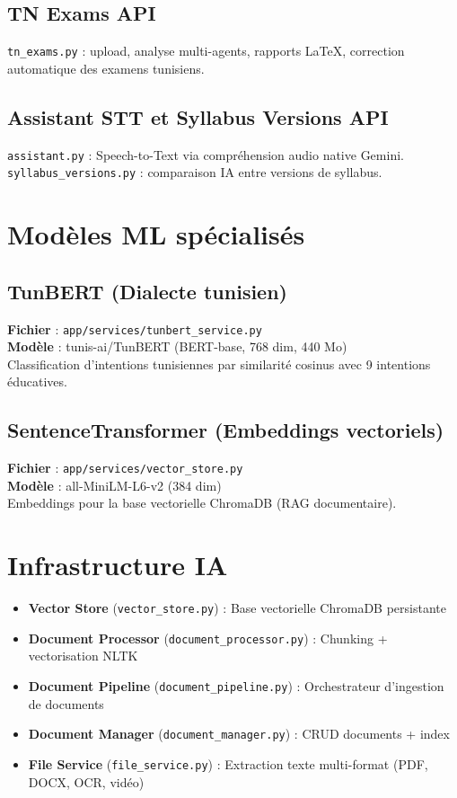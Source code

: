 \documentclass[12pt,a4paper]{article}
\begin{document}
\subsection{TN Exams API}
\texttt{tn\_exams.py} : upload, analyse multi-agents, rapports LaTeX, correction automatique des examens tunisiens.

\subsection{Assistant STT et Syllabus Versions API}
\texttt{assistant.py} : Speech-to-Text via compréhension audio native Gemini. \\
\texttt{syllabus\_versions.py} : comparaison IA entre versions de syllabus.

\section{Modèles ML spécialisés}

\subsection{TunBERT (Dialecte tunisien)}
\textbf{Fichier} : \texttt{app/services/tunbert\_service.py} \\
\textbf{Modèle} : tunis-ai/TunBERT (BERT-base, 768 dim, 440 Mo) \\
Classification d'intentions tunisiennes par similarité cosinus avec 9 intentions éducatives.

\subsection{SentenceTransformer (Embeddings vectoriels)}
\textbf{Fichier} : \texttt{app/services/vector\_store.py} \\
\textbf{Modèle} : all-MiniLM-L6-v2 (384 dim) \\
Embeddings pour la base vectorielle ChromaDB (RAG documentaire).

\section{Infrastructure IA}

\begin{itemize}[leftmargin=*]
    \item \textbf{Vector Store} (\texttt{vector\_store.py}) : Base vectorielle ChromaDB persistante
    \item \textbf{Document Processor} (\texttt{document\_processor.py}) : Chunking + vectorisation NLTK
    \item \textbf{Document Pipeline} (\texttt{document\_pipeline.py}) : Orchestrateur d'ingestion de documents
    \item \textbf{Document Manager} (\texttt{document\_manager.py}) : CRUD documents + index
    \item \textbf{File Service} (\texttt{file\_service.py}) : Extraction texte multi-format (PDF, DOCX, OCR, vidéo)
\end{itemize}
\end{document}
